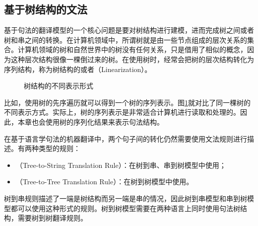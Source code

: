 
\subsection{基于树结构的文法}

\parinterval 基于句法的翻译模型的一个核心问题是要对树结构进行建模，进而完成树之间或者树和串之间的转换。在计算机领域中，所谓树就是由一些节点组成的层次关系的集合。计算机领域的树和自然世界中的树没有任何关系，只是借用了相似的概念，因为这种层次结构很像一棵倒过来的树。在使用树时，经常会把树的层次结构转化为序列结构，称为树结构的{\small{}}或者{\small{}}（Linearization）。

\begin{figure}[htp]
\centering

\caption{树结构的不同表示形式}
\label{fig:8-18}
\end{figure}

\parinterval 比如，使用树的先序遍历就可以得到一个树的序列表示。图\ref{fig:8-18}就对比了同一棵树的不同表示方式。实际上，树的序列表示是非常适合计算机进行读取和处理的。因此，本章也会使用树的序列化结果来表示句法结构。

\parinterval 在基于语言学句法的机器翻译中，两个句子间的转化仍然需要使用文法规则进行描述。有两种类型的规则：

\begin{itemize}
\vspace{0.5em}
\item {\small{}}（Tree-to-String Translation Rule）：在树到串、串到树模型中使用；
\vspace{0.5em}
\item {\small{}}（Tree-to-Tree Translation Rule）：在树到树模型中使用。
\vspace{0.5em}
\end{itemize}

\parinterval 树到串规则描述了一端是树结构而另一端是串的情况，因此树到串模型和串到树模型都可以使用这种形式的规则。树到树模型需要在两种语言上同时使用句法树结构，需要树到树翻译规则。

